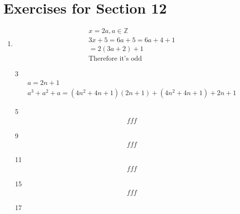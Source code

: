 \documentclass[12pt]{article}
\begin{document}
\section*{Exercises for Section 12}
\begin{enumerate}
	\item 
	    \begin{equation*}
	    	\begin{split}
		    x = 2a, a \in \mathbb{Z}\\
		    3x + 5 = 6a + 5 = 6a + 4 + 1\\
		    = 2(3a + 2) + 1\\
		    \text{Therefore it's odd}
	    	\end{split}
	    \end{equation*}
	\item [3]
	    \begin{equation*}
	    	\begin{split}
	    	    a = 2n + 1\\
		    a^3 + a^2 + a = (4n^2 + 4n + 1)(2n + 1) + (4n^2 + 4n + 1) + 2n + 1
	    	\end{split}
	    \end{equation*}
	\item [5] 
	    \begin{equation*}
	    	\begin{split}
	    	    fff
	    	\end{split}
	    \end{equation*}
	\item [9] 
	    \begin{equation*}
	    	\begin{split}
	    	    fff
	    	\end{split}
	    \end{equation*}
	\item [11] 
	    \begin{equation*}
	    	\begin{split}
	    	    fff
	    	\end{split}
	    \end{equation*}
	\item [15] 
	    \begin{equation*}
	    	\begin{split}
	    		fff
	    	\end{split}
	    \end{equation*}
	\item [17] 
	    \begin{equation*}
	    	\begin{split}

\end{split}
\end{equation*}
\end{enumerate}
\end{document}
